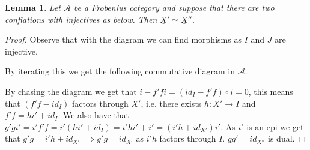 \documentclass[12pt]{article}
\newtheorem{lemma}[theorem]{Lemma}
\theoremstyle{definition}
\theoremstyle{remark}
\begin{document}
            \begin{lemma}
                Let $\mathcal{A}$ be a Frobenius category and suppose that there are two conflations with injectives as below. Then $\underline{X}'\simeq\underline{X}''$.
                \begin{center}
                \end{center}
            \end{lemma}

            \begin{proof}
                Observe that with the diagram we can find morphisms as $I$ and $J$ are injective.
                \begin{center}
                \end{center}
                By iterating this we get the following commutative diagram in $\mathcal{A}$.
                \begin{center}
                \end{center}
                By chasing the diagram we get that $i-f'fi=(id_I-f'f)\circ i = 0$, this means that $(f'f-id_I)$ factors through $X'$, i.e. there exists $h:X'\rightarrow I$ and $f'f = hi'+id_I$. We also have that $g'gi' = i'f'f = i'(hi' +id_I) = i'hi' + i' = (i'h+id_{X'})i'$. As $i'$ is an epi we get that $g'g = i'h + id_{X'} \implies \underline{g'g}=id_{\underline{X}'}$ as $i'h$ factors through $I$. $\underline{gg'}=id_{\underline{X}''}$ is dual.
            \end{proof}
\end{document}
